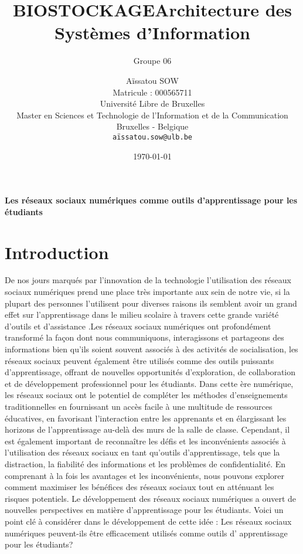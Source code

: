 \documentclass[12pt,a4paper,titlepage]{article}
\title{BIOSTOCKAGE} %
\author{Groupe 06}
\title{Architecture des Systèmes d'Information {}}
\author{Aïssatou SOW\\
   Matricule : 000565711\\
   Université Libre de Bruxelles\\
   Master en Sciences et Technologie de l'Information et de la Communication\\
   Bruxelles - Belgique\\
   \texttt{aïssatou.sow@ulb.be}}
\date{\today}
\begin{document}
\begin{center}
\begin{minipage}{.6\textwidth}
\begin{center}
\huge {\textbf {Les réseaux sociaux numériques comme outils d'apprentissage pour les étudiants  }} 
\end{center}
\end{minipage}
\end{center}
\vfill %

\newpage
\tableofcontents


\newpage

\section*{Introduction}
De nos jours marqués par l’innovation de la technologie l’utilisation des réseaux sociaux numériques prend une place très importante aux sein de notre vie, si la plupart des personnes l’utilisent pour diverses raisons ils semblent avoir un grand effet sur l’apprentissage dans le milieu scolaire à travers cette grande variété d’outils et d’assistance .Les réseaux sociaux numériques ont profondément transformé la façon dont nous communiquons, interagissons et partageons des informations bien qu'ils soient souvent associés à des activités de socialisation, les réseaux sociaux peuvent également être utilisés comme des outils puissants d'apprentissage, offrant de nouvelles opportunités d'exploration, de collaboration et de développement professionnel pour les étudiants. Dans cette ère numérique, les réseaux sociaux ont le potentiel de compléter les méthodes d'enseignements traditionnelles en fournissant un accès facile à une multitude de ressources éducatives, en favorisant l'interaction entre les apprenants et en élargissant les horizons de l'apprentissage au-delà des murs de la salle de classe. Cependant,  il est également important de reconnaître les défis et les inconvénients associés à l'utilisation des réseaux sociaux en tant qu'outils d'apprentissage, tels que la distraction, la fiabilité des informations et les problèmes de confidentialité. En comprenant à la fois les avantages et les inconvénients, nous pouvons explorer comment maximiser les bénéfices des réseaux sociaux tout en atténuant les risques potentiels. Le développement des réseaux sociaux numériques a ouvert de nouvelles perspectives en matière d'apprentissage pour les étudiants. Voici un point clé à considérer dans le développement de cette idée : 
Les réseaux sociaux numériques peuvent-ils être efficacement utilisés comme outils d' apprentissage pour les étudiants? 
\end{document}
